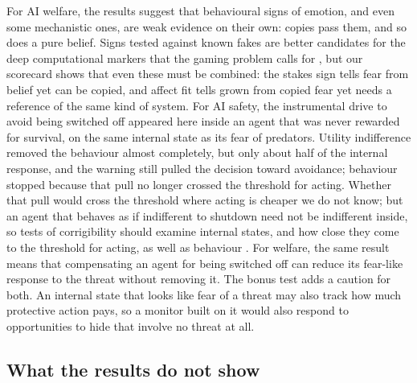 \documentclass[11pt]{article}
\begin{document}
For AI welfare, the results suggest that behavioural signs of emotion, and even some mechanistic ones, are weak evidence on their own: copies pass them, and so does a pure belief. Signs tested against known fakes are better candidates for the deep computational markers that the gaming problem calls for \cite{birch2024edge}, but our scorecard shows that even these must be combined: the stakes sign tells fear from belief yet can be copied, and affect fit tells grown from copied fear yet needs a reference of the same kind of system. For AI safety, the instrumental drive to avoid being switched off \cite{omohundro2008drives,turner2021power} appeared here inside an agent that was never rewarded for survival, on the same internal state as its fear of predators. Utility indifference \cite{soares2015corrigibility} removed the behaviour almost completely, but only about half of the internal response, and the warning still pulled the decision toward avoidance; behaviour stopped because that pull no longer crossed the threshold for acting. Whether that pull would cross the threshold where acting is cheaper we do not know; but an agent that behaves as if indifferent to shutdown need not be indifferent inside, so tests of corrigibility should examine internal states, and how close they come to the threshold for acting, as well as behaviour \cite{altman2026continuation}. For welfare, the same result means that compensating an agent for being switched off can reduce its fear-like response to the threat without removing it. The bonus test adds a caution for both. An internal state that looks like fear of a threat may also track how much protective action pays, so a monitor built on it would also respond to opportunities to hide that involve no threat at all.

\subsection{What the results do not show}
\label{sec:limits}
\end{document}

